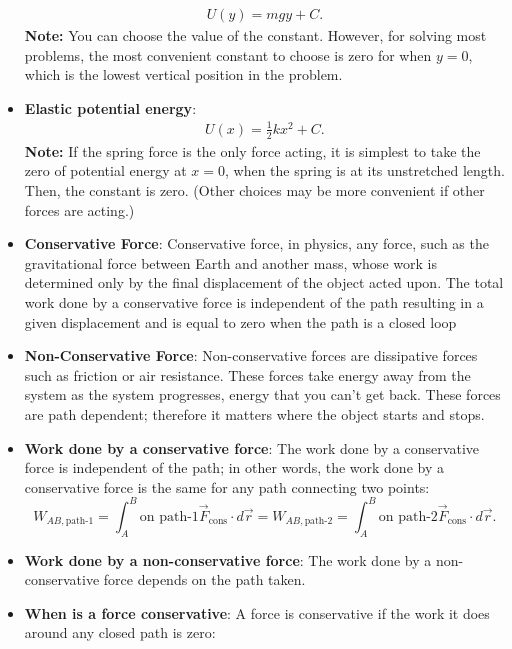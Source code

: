 \documentclass{report}
\begin{document}
\begin{itemize}
            \begin{align*}
                U(y) = mgy + C
            .\end{align*}
            \bigbreak \noindent 
            \textbf{Note:} You can choose the value of the constant. However, for solving most problems, the most convenient constant to choose is zero for when $y=0$, which is the lowest vertical position in the problem. 
        \item \textbf{Elastic potential energy}:
            \begin{align*}
                U(x) = \frac{1}{2}kx^{2} + C 
            .\end{align*}
            \bigbreak \noindent 
            \textbf{Note:} If the spring force is the only force acting, it is simplest to take the zero of potential energy at $x=0$, when the spring is at its unstretched length. Then, the constant is zero. (Other choices may be more convenient if other forces are acting.)
        \item \textbf{Conservative Force}: Conservative force, in physics, any force, such as the gravitational force between Earth and another mass, whose work is determined only by the final displacement of the object acted upon. The total work done by a conservative force is independent of the path resulting in a given displacement and is equal to zero when the path is a closed loop
        \item \textbf{Non-Conservative Force}: Non-conservative forces are dissipative forces such as friction or air resistance. These forces take energy away from the system as the system progresses, energy that you can’t get back. These forces are path dependent; therefore it matters where the object starts and stops.
        \item \textbf{Work done by a conservative force}: The work done by a conservative force is independent of the path; in other words, the work done by a conservative force is the same for any path connecting two points:
            \[
                W_{AB,\text{path-1}} = \int_{A}^{B} \text{on path-1} \vec{F}_{\text{cons}} \cdot d\vec{r} = W_{AB,\text{path-2}} = \int_{A}^{B} \text{on path-2} \vec{F}_{\text{cons}} \cdot d\vec{r}.
            \]
        \item \textbf{Work done by a non-conservative force}: The work done by a non-conservative force depends on the path taken.
        \item \textbf{When is a force conservative}:
        A force is conservative if the work it does around any closed path is zero:

\end{itemize}
\end{document}
